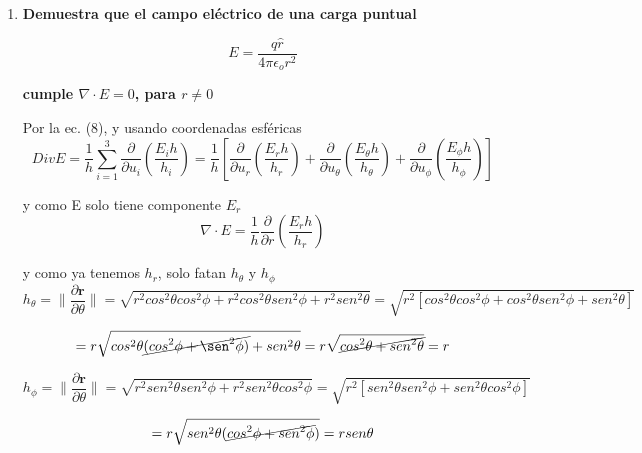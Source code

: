 \documentclass[12pt,a4paper]{article}
\providecommand{\norm}[1]{\lVert#1\rVert}
\begin{document}
\begin{enumerate}
    
    \item \textbf{Demuestra que el campo eléctrico de una carga puntual}
    
    \begin{equation*}
        E = \frac{q \hat{r}}{4 \pi \epsilon_o r^2}
    \end{equation*}
    
    \textbf{cumple $\nabla \cdot E = 0$, para $r \neq 0$}
    
    Por la ec. (8), y usando coordenadas esféricas
    \begin{equation*}
        Div E = \frac{1}{h} \sum_{i=1}^{3} \frac{\partial}{\partial u_i}\left(\frac{E_ih}{h_i}\right) = \frac{1}{h}\left[\frac{\partial}{\partial u_r}\left(\frac{E_rh}{h_r}\right) + \frac{\partial}{\partial u_\theta}\left(\frac{E_\theta h}{h_\theta}\right) + \frac{\partial}{\partial u_\phi}\left(\frac{E_\phi h}{h_\phi}\right) \right]
    \end{equation*}
    
    y como E solo tiene componente $E_r$
    \begin{equation*}
        \nabla \cdot E = \frac{1}{h} \frac{\partial}{\partial r} \left( \frac{E_r h}{h_r}\right)
    \end{equation*}
    
    y como ya tenemos $h_r$, solo fatan $h_\theta$ y $h_\phi$
    \begin{equation*}
        h_\theta = \norm{\frac{\partial \textbf{r}}{\partial \theta}} =\sqrt{r^2 cos^2 \theta cos^2 \phi + r^2 cos^2 \theta sen^2 \phi + r^2 sen^2 \theta} = \sqrt{r^2 \left[ cos^2 \theta cos^2 \phi + cos^2\theta sen^2 \phi + sen^2 \theta \right]}
    \end{equation*}
    
    \begin{equation*}
        = r \sqrt{cos^2 \theta \cancel{(cos^2 \phi + \sen^2 \phi)} + sen^2 \theta} = r\sqrt{\cancel{cos^2 \theta + sen^2 \theta}} = r
    \end{equation*}
    
    \begin{equation*}
        h_\phi = \norm {\frac{\partial \textbf{r}}{\partial \theta}} = \sqrt{r^2 sen^2 \theta sen^2 \phi + r^2 sen^2 \theta cos^2 \phi} = \sqrt{r^2\left[sen^2 \theta sen^2 \phi + sen^2 \theta cos^2 \phi  \right]}
    \end{equation*}
    
    \begin{equation*}
        = r \sqrt{sen^2 \theta (\cancel{cos^2 \phi + sen^2 \phi}) } = r sen \theta
    \end{equation*}
    

\end{enumerate}
\end{document}
